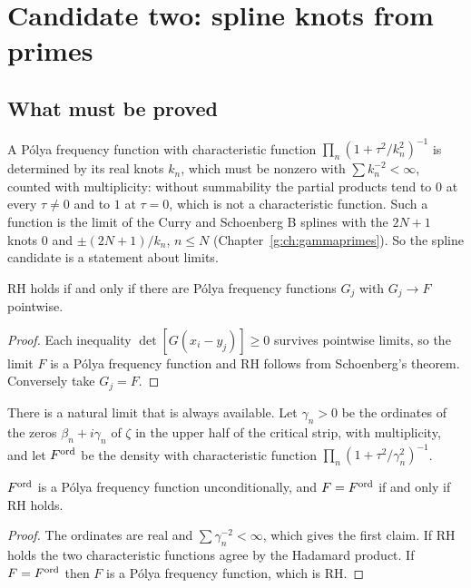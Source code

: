\section{Candidate two: spline knots from primes}\label{c:sec:knots}

\subsection{What must be proved}

A P\'olya frequency function with characteristic function $\prod_n(1+\tau^2/k_n^2)^{-1}$ is determined by its real knots $k_n$, which must be nonzero with $\sum k_n^{-2}<\infty$, counted with multiplicity: without summability the partial products tend to $0$ at every $\tau\ne0$ and to $1$ at $\tau=0$, which is not a characteristic function. Such a function is the limit of the Curry and Schoenberg B splines \cite{CurrySchoenberg66} with the $2N+1$ knots $0$ and $\pm(2N+1)/k_n$, $n\le N$ (Chapter~\ref{g:ch:gammaprimes}). So the spline candidate is a statement about limits.

\begin{proposition}\label{c:prop:closure}
RH holds if and only if there are P\'olya frequency functions $G_j$ with $G_j\to F$ pointwise.
\end{proposition}

\begin{proof}
Each inequality $\det[G(x_i-y_j)]\ge0$ survives pointwise limits, so the limit $F$ is a P\'olya frequency function and RH follows from Schoenberg's theorem. Conversely take $G_j=F$.
\end{proof}

There is a natural limit that is always available. Let $\gamma_n>0$ be the ordinates of the zeros $\beta_n+i\gamma_n$ of $\zeta$ in the upper half of the critical strip, with multiplicity, and let $F^{\rm ord}$ be the density with characteristic function $\prod_n(1+\tau^2/\gamma_n^2)^{-1}$.

\begin{proposition}\label{c:prop:ord}
$F^{\rm ord}$ is a P\'olya frequency function unconditionally, and $F=F^{\rm ord}$ if and only if RH holds.
\end{proposition}

\begin{proof}
The ordinates are real and $\sum\gamma_n^{-2}<\infty$, which gives the first claim. If RH holds the two characteristic functions agree by the Hadamard product. If $F=F^{\rm ord}$ then $F$ is a P\'olya frequency function, which is RH.
\end{proof}

